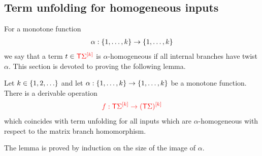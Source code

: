 
\subsection{Term unfolding for homogeneous inputs}
\label{sec:homo-unfold}
For a monotone function 
\begin{align*}
\alpha: \set{1,\ldots,k} \to \set{1,\ldots,k}
\end{align*}
we say that a term $ t \in \tmonad \mati k \rSigma$ is $\alpha$-homogeneous if all internal branches have twist $\alpha$. This section is devoted to proving the following lemma. 

\begin{lemma}\label{lem:homo-twist}
    Let $k \in \set{1,2,\ldots}$ and let $\alpha : \set{1,\ldots,k} \to \set{1,\ldots,k}$ be a monotone function. There is a derivable operation 
    \begin{align*}
        \ranked{f : \tmonad \mati k \rSigma \to \mati k {(\tmonad \Sigma)} }
        \end{align*}      
which coincides with term unfolding for all inputs which are $\alpha$-homogeneous with respect to the matrix branch homomorphism.
\end{lemma}

The lemma is proved by induction on the size of the image of $\alpha$. 